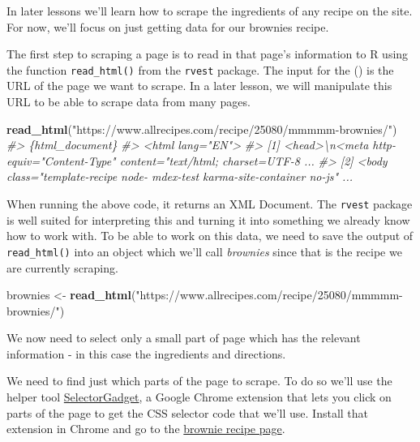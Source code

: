 \documentclass[
  12pt,
]{book}
\newenvironment{Shaded}{\begin{snugshade}}{\end{snugshade}}
\newcommand{\CommentTok}[1]{\textcolor[rgb]{0.56,0.35,0.01}{\textit{#1}}}
\newcommand{\KeywordTok}[1]{\textcolor[rgb]{0.13,0.29,0.53}{\textbf{#1}}}
\newcommand{\NormalTok}[1]{#1}
\newcommand{\StringTok}[1]{\textcolor[rgb]{0.31,0.60,0.02}{#1}}
\begin{document}
In later lessons we'll learn how to scrape the ingredients of any recipe on the site. For now, we'll focus on just getting data for our brownies recipe.

The first step to scraping a page is to read in that page's information to R using the function \texttt{read\_html()} from the \texttt{rvest} package. The input for the () is the URL of the page we want to scrape. In a later lesson, we will manipulate this URL to be able to scrape data from many pages.

\begin{Shaded}
\begin{Highlighting}[]
\KeywordTok{read\_html}\NormalTok{(}\StringTok{"https://www.allrecipes.com/recipe/25080/mmmmm{-}brownies/"}\NormalTok{)}
\CommentTok{\#> \{html\_document\}}
\CommentTok{\#> <html lang="EN">}
\CommentTok{\#> [1] <head>\textbackslash{}n<meta http{-}equiv="Content{-}Type" content="text/html; charset=UTF{-}8 ...}
\CommentTok{\#> [2] <body class="template{-}recipe node{-} mdex{-}test karma{-}site{-}container no{-}js"  ...}
\end{Highlighting}
\end{Shaded}

When running the above code, it returns an XML Document. The \texttt{rvest} package is well suited for interpreting this and turning it into something we already know how to work with. To be able to work on this data, we need to save the output of \texttt{read\_html()} into an object which we'll call \emph{brownies} since that is the recipe we are currently scraping.

\begin{Shaded}
\begin{Highlighting}[]
\NormalTok{brownies <{-}}\StringTok{ }\KeywordTok{read\_html}\NormalTok{(}\StringTok{"https://www.allrecipes.com/recipe/25080/mmmmm{-}brownies/"}\NormalTok{)}
\end{Highlighting}
\end{Shaded}

We now need to select only a small part of page which has the relevant information - in this case the ingredients and directions.

We need to find just which parts of the page to scrape. To do so we'll use the helper tool \href{https://selectorgadget.com/}{SelectorGadget}, a Google Chrome extension that lets you click on parts of the page to get the CSS selector code that we'll use. Install that extension in Chrome and go to the \href{https://www.allrecipes.com/recipe/25080/mmmmm-brownies/?internalSource=hub\%20recipe\&referringContentType=Search}{brownie recipe page}.
\end{document}
